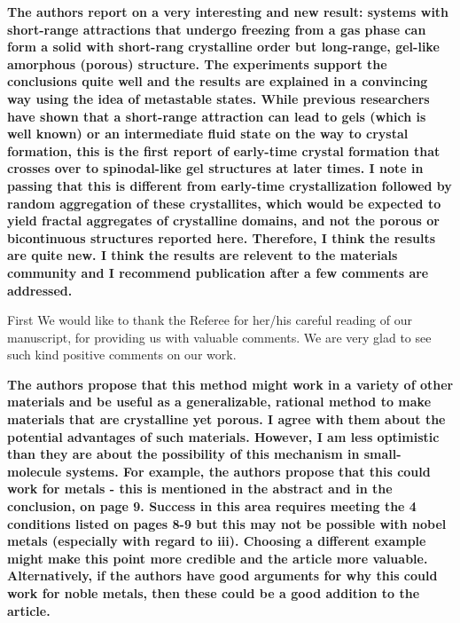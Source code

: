 \documentclass[11pt]{article}
\begin{document}
{\bf
The authors report on a very interesting and new result: systems with short-range attractions that undergo freezing from a gas phase can form a solid with short-rang crystalline order but long-range, gel-like amorphous (porous) structure. The experiments support the conclusions quite well and the results are explained in a convincing way using the idea of metastable states. While previous researchers have shown that a short-range attraction can lead to gels (which is well known) or an intermediate fluid state on the way to crystal formation, this is the first report of early-time crystal formation that crosses over to spinodal-like gel structures at later times. I note in passing that this is different from early-time crystallization followed by random aggregation of these crystallites, which would be expected to yield fractal aggregates of crystalline domains, and not the porous or bicontinuous structures reported here. Therefore, I think the results are quite new. I think the results are relevent to the 
materials community and I recommend publication after a few comments are addressed.
}


\bigskip
\doublespacing

First We would like to thank the Referee for her/his careful reading of our manuscript, for providing us with valuable comments. We are very glad to see such kind positive comments on our work.


\vspace{1em}

\singlespacing

{\bf
The authors propose that this method might work in a variety of other materials and be useful as a generalizable, rational method to make materials that are crystalline yet porous. I agree with them about the potential advantages of such materials. However, I am less optimistic than they are about the possibility of this mechanism in small-molecule systems. For example, the authors propose that this could work for metals - this is mentioned in the abstract and in the conclusion, on page 9. Success in this area requires meeting the 4 conditions listed on pages 8-9 but this may not be possible with nobel metals (especially with regard to iii). Choosing a different example might make this point more credible and the article more valuable. Alternatively, if the authors have good arguments for why this could work for noble metals, then these could be a good addition to the article.
}



\bigskip
\doublespacing
\end{document}
